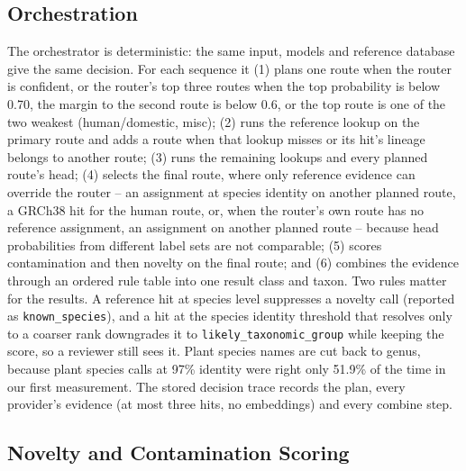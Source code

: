 \documentclass[conference]{IEEEtran}
\begin{document}
\subsection{Orchestration}
\label{sec:orchestrator}

The orchestrator is deterministic: the same input, models and reference database give the same decision. For each sequence it (1) plans one route when the router is confident, or the router's top three routes when the top probability is below 0.70, the margin to the second route is below 0.6, or the top route is one of the two weakest (human/domestic, misc); (2) runs the reference lookup on the primary route and adds a route when that lookup misses or its hit's lineage belongs to another route; (3) runs the remaining lookups and every planned route's head; (4) selects the final route, where only reference evidence can override the router -- an assignment at species identity on another planned route, a GRCh38 hit for the human route, or, when the router's own route has no reference assignment, an assignment on another planned route -- because head probabilities from different label sets are not comparable; (5) scores contamination and then novelty on the final route; and (6) combines the evidence through an ordered rule table into one result class and taxon. Two rules matter for the results. A reference hit at species level suppresses a novelty call (reported as \texttt{known\_species}), and a hit at the species identity threshold that resolves only to a coarser rank downgrades it to \texttt{likely\_taxonomic\_group} while keeping the score, so a reviewer still sees it. Plant species names are cut back to genus, because plant species calls at 97\% identity were right only 51.9\% of the time in our first measurement. The stored decision trace records the plan, every provider's evidence (at most three hits, no embeddings) and every combine step.

\subsection{Novelty and Contamination Scoring}
\end{document}
